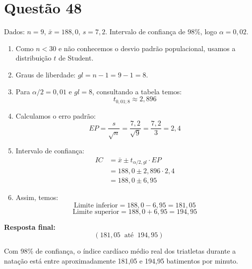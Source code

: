 \documentclass[12pt]{article}
\newcommand{\quest}[1]{\section*{Questão #1}} %
\begin{document}
\quest{48}
Dados: $n=9$, $\bar{x}=188,0$, $s=7,2$. Intervalo de confiança de 98\%, logo $\alpha=0,02$.

\begin{enumerate}
    \item Como $n < 30$ e não conhecemos o desvio padrão populacional, usamos a distribuição $t$ de Student.
    \item Graus de liberdade: $gl = n-1 = 9-1=8$.
    \item Para $\alpha/2=0,01$ e $gl=8$, consultando a tabela temos:
    \[
    t_{0,01;8} \approx 2,896
    \]
    \item Calculamos o erro padrão:
    \[
    EP = \frac{s}{\sqrt{n}} = \frac{7,2}{\sqrt{9}} = \frac{7,2}{3} = 2,4
    \]
    \item Intervalo de confiança:
    \begin{align*}
        IC &= \bar{x} \pm t_{\alpha/2,gl} \cdot EP \\
           &= 188,0 \pm 2,896 \cdot 2,4 \\
           &= 188,0 \pm 6,95
    \end{align*}
    \item Assim, temos:
    \[
    \text{Limite inferior} = 188,0 - 6,95 = 181,05
    \]
    \[
    \text{Limite superior} = 188,0 + 6,95 = 194,95
    \]
\end{enumerate}

\textbf{Resposta final:}
\[
\boxed{(181,05 \;\;\text{até}\;\; 194,95)}
\]

Com 98\% de confiança, o índice cardíaco médio real dos triatletas durante a natação está entre aproximadamente 181,05 e 194,95 batimentos por minuto.
\end{document}
